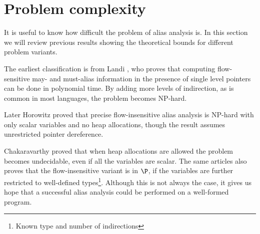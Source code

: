 \section{Problem complexity}

It is useful to know how difficult the problem of alias analysis is. In this
section we will review previous results showing the theoretical bounds for
different problem variants.

The earliest classification is from Landi \cite{Landi1991}, who proves that
computing flow-sensitive may- and must-alias information in the presence of
single level pointers can be done in polynomial time. By adding more levels of
indirection, as is common in most languages, the problem becomes NP-hard.

Later Horowitz \cite{Horowitz1997}  proved that precise flow-insensitive alias
analysis is NP-hard with only scalar variables and no heap allocations, though
the result assumes unrestricted pointer dereference.

Chakaravarthy \cite{ptcomp} proved that when heap allocations are allowed the
problem becomes undecidable, even if all the variables are scalar. The same
articles also proves that the flow-insensitive variant is in $\P$, if the
variables are further restricted to well-defined types\footnote{Known type and
number of indirections}. Although this is not always the case, it gives us hope
that a successful alias analysis could be performed on a well-formed program.


